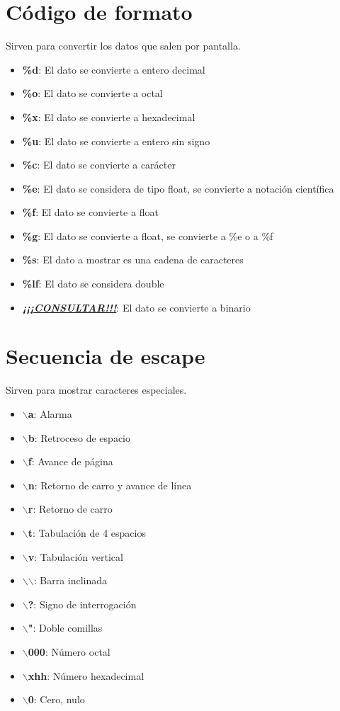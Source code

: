 \section [Código de formato]{Código de formato}
Sirven para convertir los datos que salen por pantalla.
\vspace{1em}
\begin{itemize}
	\item {\textbf{\%d}: El dato se convierte a entero decimal}
	\item {\textbf{\%o}: El dato se convierte a octal}
	\item {\textbf{\%x}: El dato se convierte a hexadecimal}
	\item {\textbf{\%u}: El dato se convierte a entero sin signo}
	\item {\textbf{\%c}: El dato se convierte a carácter}
	\item {\textbf{\%e}: El dato se considera de tipo float, se convierte a notación científica}
	\item {\textbf{\%f}: El dato se convierte a float}
	\item {\textbf{\%g}: El dato se convierte a float, se convierte a \%e o a \%f}
	\item {\textbf{\%s}: El dato a mostrar es una cadena de caracteres}
	\item {\textbf{\%lf}: El dato se considera double}
	\item {{\Huge \textbf{\textit{\underline{¡¡¡CONSULTAR!!!}}}}: El dato se convierte a binario}
\end{itemize}

\section [Secuencia de escape]{Secuencia de escape}
Sirven para mostrar caracteres especiales.
\vspace{1em}
\begin{itemize}
	\item {\textbf{$\backslash$a}: Alarma}
	\item {\textbf{$\backslash$b}: Retroceso de espacio}
	\item {\textbf{$\backslash$f}: Avance de página}
	\item {\textbf{$\backslash$n}: Retorno de carro y avance de línea}
	\item {\textbf{$\backslash$r}: Retorno de carro}
	\item {\textbf{$\backslash$t}: Tabulación de 4 espacios}
	\item {\textbf{$\backslash$v}: Tabulación vertical}
	\item {\textbf{$\backslash$$\backslash$}: Barra inclinada}
	\item {\textbf{$\backslash$?}: Signo de interrogación}
	\item {\textbf{$\backslash$"}: Doble comillas}
	\item {\textbf{$\backslash$000}: Número octal}
	\item {\textbf{$\backslash$xhh}: Número hexadecimal}
	\item {\textbf{$\backslash$0}: Cero, nulo}
\end{itemize}

